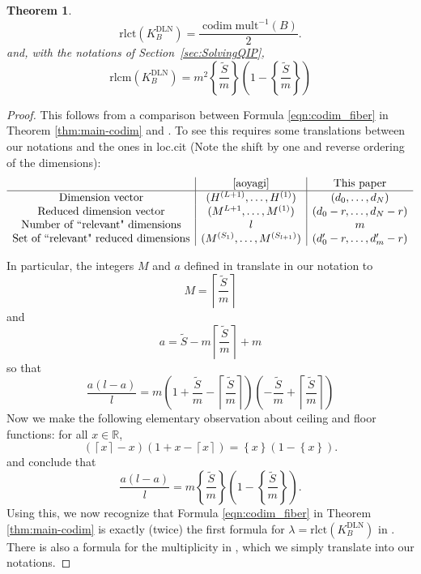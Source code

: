\documentclass[a4paper]{amsart}
\DeclareMathOperator{\codim}{\mathrm{codim}}
\newcommand{\R}{\mathbb{R}}
\newcommand{\rlct}{\mathrm{rlct}}
\newcommand{\rlcm}{\mathrm{rlcm}}
\newcommand{\DLN}{\mathrm{DLN}}
\newcommand{\mult}{\mathrm{mult}}
\newtheorem{thm}{Theorem}[section]
\theoremstyle{plain}
\begin{document}
\begin{thm}\label{thm:aoyagi-rlct}
\[
\rlct(K^{\DLN}_B)= \frac{\codim \mult^{-1}(B)}{2}.
\]
and, with the notations of Section~\ref{sec:SolvingQIP},
\[
\rlcm(K^{\DLN}_B)=m^2\left\{\frac{\tilde{S}}{m} \right\}\left(1-\left\{\frac{\tilde{S}}{m} \right\}\right)
\]
\end{thm}
\begin{proof}
    This follows from a comparison between Formula \eqref{eqn:codim_fiber} in Theorem \ref{thm:main-codim} and \cite[Theorem 1]{aoyagi}. To see this requires some translations between our notations and the ones in loc.cit (Note the shift by one and reverse ordering of the dimensions):
\[
\begin{array}{c|c|c}
    & \text{\cite{aoyagi}} &\text{This paper} \\
 \hline  \text{Dimension vector}  & (H^{(L+1)},\ldots,H^{(1)})  & (d_0,\ldots,d_N)  \\
   \text{Reduced dimension vector}  &  (M^{L+1},\ldots,M^{(1)}) & (d_0-r,\ldots,d_N-r) \\
   \text{Number of ``relevant" dimensions} & l & m \\
   \text{Set of ``relevant" reduced dimensions} & (M^{(S_1)},\ldots,M^{(S_{l+1})}) & (d'_0-r,\ldots,d'_m-r) \\
\end{array}
\]

In particular, the integers $M$ and $a$ defined in \cite[Theorem 1]{aoyagi} translate in our notation to
\[
M=\left\lceil \frac{\tilde{S}}{m}\right\rceil
\]
and
\[
a=\tilde{S}-m\left\lceil\frac{\tilde{S}}{m}\right\rceil+m
\]
so that
\[
\frac{a(l-a)}{l}=m\left (1+\frac{\tilde{S}}{m}-\left\lceil\frac{\tilde{S}}{m}\right\rceil\right)\left (-\frac{\tilde{S}}{m}+\left\lceil\frac{\tilde{S}}{m}\right\rceil\right)
\]
Now we make the following elementary observation about ceiling and floor functions: for all $x\in \R$, 
    \[
    (\left\lceil x\right\rceil-x)(1+x-\left\lceil x\right\rceil)=\left\{x\right\}(1-\left\{x\right\}).
    \]
and conclude that
\[
\frac{a(l-a)}{l}=m\left\{\frac{\tilde{S}}{m} \right\}\left(1-\left\{\frac{\tilde{S}}{m} \right\}\right).
\]
Using this, we now recognize that Formula \eqref{eqn:codim_fiber} in Theorem \ref{thm:main-codim} is exactly (twice) the first formula for $\lambda=\rlct(K^{\DLN}_B)$ in \cite[Theorem 1]{aoyagi}. There is also a formula for the multiplicity in \cite[Theorem 1]{aoyagi}, which we simply translate into our notations. 
\end{proof}
\end{document}
